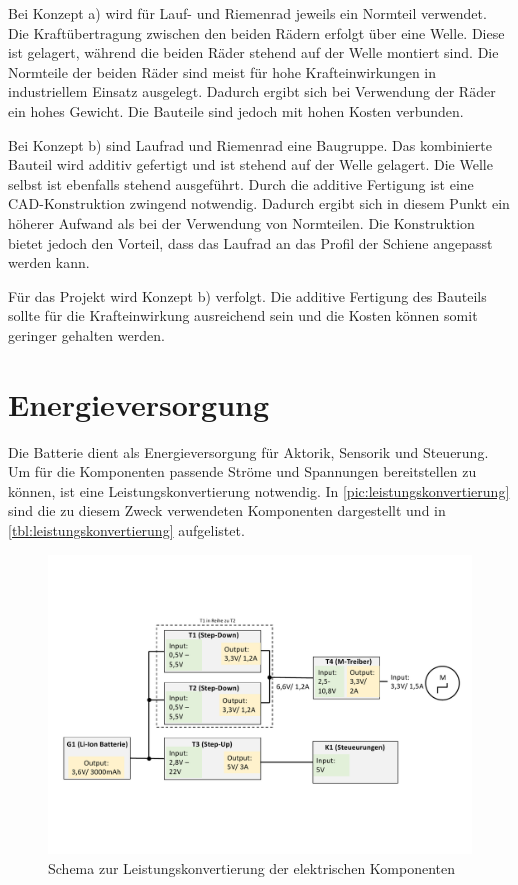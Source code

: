 Bei Konzept a) wird für Lauf- und Riemenrad jeweils ein Normteil verwendet. Die Kraftübertragung zwischen den beiden Rädern erfolgt über eine Welle. Diese ist gelagert, während die beiden Räder stehend auf der Welle montiert sind. Die Normteile der beiden Räder sind meist für hohe Krafteinwirkungen in industriellem Einsatz ausgelegt. Dadurch ergibt sich bei Verwendung der Räder ein hohes Gewicht. Die Bauteile sind jedoch mit hohen Kosten verbunden.

Bei Konzept b) sind Laufrad und Riemenrad eine Baugruppe. Das kombinierte Bauteil wird additiv gefertigt und ist stehend auf der Welle gelagert. Die Welle selbst ist ebenfalls stehend ausgeführt. Durch die additive Fertigung ist eine CAD-Konstruktion zwingend notwendig. Dadurch ergibt sich in diesem Punkt ein höherer Aufwand als bei der Verwendung von Normteilen. Die Konstruktion bietet jedoch den Vorteil, dass das Laufrad an das Profil der Schiene angepasst werden kann. 

Für das Projekt wird Konzept b) verfolgt. Die additive Fertigung des Bauteils sollte für die Krafteinwirkung ausreichend sein und die Kosten können somit geringer gehalten werden. 

\newpage

\section{Energieversorgung}
\label{sec:konzeptEnergieversorgung}
Die Batterie dient als Energieversorgung für Aktorik, Sensorik und Steuerung. Um für die Komponenten passende Ströme und Spannungen bereitstellen zu können, ist eine Leistungskonvertierung notwendig. In \autoref{pic:leistungskonvertierung} sind die zu diesem Zweck verwendeten Komponenten dargestellt und in \autoref{tbl:leistungskonvertierung} aufgelistet. 

\begin{figure}[h]
	\begin{center}
		\includegraphics[width=17cm]{leistungskonvertierung.pdf}
		\caption{Schema zur Leistungskonvertierung der elektrischen Komponenten}
		\label{pic:leistungskonvertierung}
	\end{center}
\end{figure}


